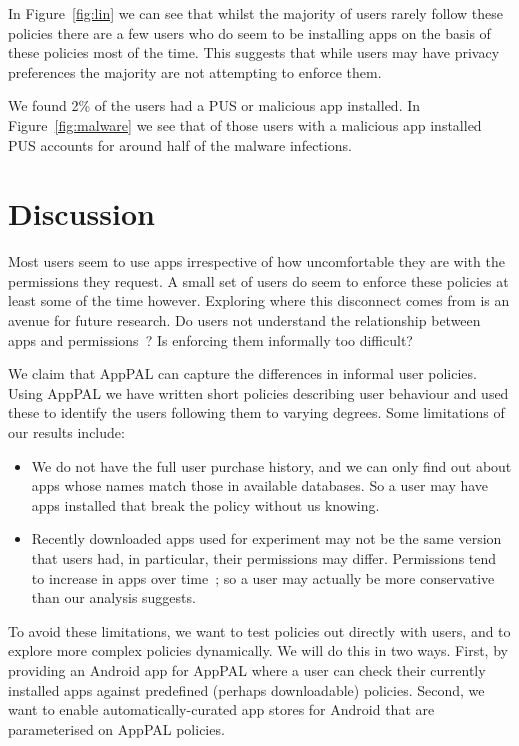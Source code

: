 \documentclass[]{soups-poster}
\newcommand{\citep}[1]{\cite{#1}}
\begin{document}
In Figure~\ref{fig:lin} we can see that whilst the majority of users rarely
follow these policies there are a few users who do seem to be installing apps on
the basis of these policies most of the time.
This suggests that while users may have privacy preferences the majority are not attempting to enforce them.

We found 2\% of the users had a PUS or malicious app installed.
In Figure~\ref{fig:malware} we see that of those users with a malicious app
installed PUS accounts for around half of the malware infections.

\section{Discussion}

Most users seem to use apps irrespective of how uncomfortable they are with the permissions they request.
A small set of users do seem to enforce these policies at least some of the time however.
Exploring where this disconnect comes from is an avenue for future research.
Do users not understand the relationship between apps and permissions~\citep{Felt:2012hma}?
Is enforcing them informally too difficult?

We claim that AppPAL can capture the differences in informal user
policies. %
Using AppPAL we have written short policies describing user behaviour
and used these to identify the users following them to varying degrees.
Some limitations of our results include:
\begin{itemize}
\item We do not have the full user purchase history, and we can only
  find out about apps whose names match those in available
  databases.  %
  So a user may have apps installed
  that break the policy without us knowing.
\item Recently downloaded apps used for experiment may not be the same version
  that users had, in particular, their permissions may differ.
  Permissions tend to increase in apps over time~\citep{Wei:2012id};
  so a user may actually be more conservative than our analysis suggests.
\end{itemize}

To avoid these limitations, we want to test policies out directly with
users, and to explore more complex policies dynamically.  We will do
this in two ways.  First, by providing an Android app for AppPAL where
a user can check their currently installed apps against predefined
(perhaps downloadable) policies.  Second, we want to enable
automatically-curated app stores for Android that are parameterised on
AppPAL policies.



\end{document}
